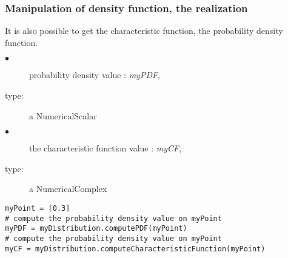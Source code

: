 \subsubsection{Manipulation of density function, the realization}
It is also possible to get the characteristic function, the probability density function.

{
  \begin{description}
  \item[$\bullet$] probability density value : {\itshape myPDF},
  \item[type:] a NumericalScalar
  \item[$\bullet$] the characteristic function value : {\itshape myCF},
  \item[type:] a NumericalComplex
  \end{description}
}
\espace

\begin{lstlisting}
myPoint = [0.3]
# compute the probability density value on myPoint
myPDF = myDistribution.computePDF(myPoint)
# compute the probability density value on myPoint
myCF = myDistribution.computeCharacteristicFunction(myPoint)
\end{lstlisting}
